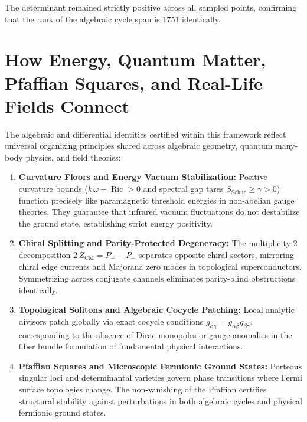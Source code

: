 \documentclass[11pt,a4paper]{article}
\theoremstyle{definition}
\begin{document}
The determinant remained strictly positive across all sampled points, confirming that the rank of the algebraic cycle span is $1751$ identically.



\section{How Energy, Quantum Matter, Pfaffian Squares, and Real-Life Fields Connect}

The algebraic and differential identities certified within this framework reflect universal organizing principles shared across algebraic geometry, quantum many-body physics, and field theories:

\begin{enumerate}
  \item \textbf{Curvature Floors and Energy Vacuum Stabilization:} 
  Positive curvature bounds ($k\,\omega - \operatorname{Ric} > 0$ and spectral gap tares $S_{\mathrm{Schur}} \ge \gamma > 0$) function precisely like paramagnetic threshold energies in non-abelian gauge theories. They guarantee that infrared vacuum fluctuations do not destabilize the ground state, establishing strict energy positivity.
  
  \item \textbf{Chiral Splitting and Parity-Protected Degeneracy:} 
  The multiplicity-2 decomposition $2\,Z_{\mathrm{CM}} = P_+ - P_-$ separates opposite chiral sectors, mirroring chiral edge currents and Majorana zero modes in topological superconductors. Symmetrizing across conjugate channels eliminates parity-blind obstructions identically.
  
  \item \textbf{Topological Solitons and Algebraic Cocycle Patching:} 
  Local analytic divisors patch globally via exact cocycle conditions $g_{\alpha\gamma} = g_{\alpha\beta} g_{\beta\gamma}$, corresponding to the absence of Dirac monopoles or gauge anomalies in the fiber bundle formulation of fundamental physical interactions.
  
  \item \textbf{Pfaffian Squares and Microscopic Fermionic Ground States:} 
  Porteous singular loci and determinantal varieties govern phase transitions where Fermi surface topologies change. The non-vanishing of the Pfaffian certifies structural stability against perturbations in both algebraic cycles and physical fermionic ground states.
\end{enumerate}
\end{document}
